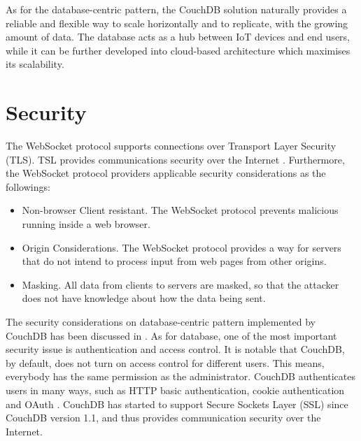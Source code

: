 As for the database-centric pattern, the CouchDB solution naturally provides a reliable and flexible way to scale horizontally and to replicate, with the growing amount of data. The database acts as a hub between IoT devices and end users, while it can be further developed into cloud-based architecture which maximises its scalability. 

\section{Security}
The WebSocket protocol supports connections over Transport Layer Security (TLS). TSL provides communications security over the Internet \cite{dierks2008rfc}. Furthermore, the WebSocket protocol providers applicable security considerations as the followings\cite{rfc64552012web}: 

\begin{itemize}
\setlength{\itemsep}{0pt}
\item Non-browser Client resistant. The WebSocket protocol prevents malicious running inside a web browser. 
\item Origin Considerations. The WebSocket protocol provides a way for servers that do not intend to process input from web pages from other origins.
\item Masking. All data from clients to servers are masked, so that the attacker does not have knowledge about how the data being sent.
\end{itemize}

The security considerations on database-centric pattern implemented by CouchDB has been discussed in \cite{francesco2012storage}. As for database, one of the most important security issue is authentication and access control. It is notable that CouchDB, by default, does not turn on access control for different users. This means, everybody has the same permission as the administrator. CouchDB authenticates users in many ways, such as HTTP basic authentication, cookie authentication and OAuth \cite{hammer2010oauth}. CouchDB has started to support Secure Sockets Layer (SSL) since CouchDB version 1.1, and thus provides communication security over the Internet.